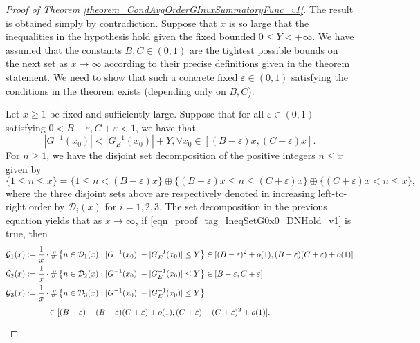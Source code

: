 \documentclass[11pt,reqno,a4letter]{article}
\numberwithin{figure}{section}
\numberwithin{table}{section}
\theoremstyle{plain}
\numberwithin{theorem}{section}
\theoremstyle{definition}
\begin{document}
\begin{proof}[Proof of Theorem \ref{theorem_CondAvgOrderGInvxSummatoryFunc_v1}] 
\label{proofOf_theorem_CondAvgOrderGInvxSummatoryFunc_v1} 
The result is obtained simply by contradiction. Suppose that $x$ is so large that the inequalities in the 
hypothesis hold given the fixed bounded $0 \leq Y < +\infty$. 
We have assumed that the constants $B,C \in (0, 1)$ are the tightest possible bounds on the next set as 
$x \rightarrow \infty$ according to their precise definitions given in the theorem statement. 
We need to show that such a 
concrete fixed $\varepsilon \in (0, 1)$ 
satisfying the conditions in the theorem exists (depending only on $B,C$). 

Let $x \geq 1$ be fixed and sufficiently large. 
Suppose that for all $\varepsilon \in (0, 1)$ satisfying $0 < B - \varepsilon, C+\varepsilon < 1$, we have that 
\begin{equation} 
\label{eqn_proof_tag_IneqSetG0x0_DNHold_v1} 
|G^{-1}(x_0)| < |G_E^{-1}(x_0)| + Y, \forall x_0 \in [(B-\varepsilon) x, (C+\varepsilon) x]. 
\end{equation} 
For $n \geq 1$, we have the disjoint set decomposition of the positive integers $n \leq x$ given by  
\[
\{1 \leq n \leq x\} = \{1 \leq n < (B-\varepsilon) x\} \oplus 
     \{(B-\varepsilon) x \leq n \leq (C + \varepsilon) x\} \oplus 
     \{(C+\varepsilon) x < n \leq x\}, 
\]
where the three disjoint sets above are respectively denoted in increasing 
left-to-right order by $\mathcal{D}_i(x)$ for $i = 1,2,3$. 
The set decomposition in the previous equation yields that as 
$x \rightarrow \infty$, if \eqref{eqn_proof_tag_IneqSetG0x0_DNHold_v1} is true, then 
\begin{align} 
\label{eqn_proof_tag_G123xDensityBounds_v1} 
\mathcal{G}_1(x) & := \frac{1}{x} \cdot \#\left\{n \in \mathcal{D}_1(x): |G^{-1}(x_0)| - |G_E^{-1}(x_0)| \leq Y\right\} 
     \in [(B-\varepsilon)^2 + o(1), (B-\varepsilon) (C+\varepsilon) + o(1)] \\ 
\notag 
\mathcal{G}_2(x) & := \frac{1}{x} \cdot \#\left\{n \in \mathcal{D}_2(x): |G^{-1}(x_0)| - |G_E^{-1}(x_0)| \leq Y\right\} 
     \in [B-\varepsilon, C+\varepsilon] \\ 
\notag 
\mathcal{G}_3(x) & := \frac{1}{x} \cdot \#\left\{n \in \mathcal{D}_3(x): |G^{-1}(x_0)| - |G_E^{-1}(x_0)| \leq Y\right\} \\ 
\notag 
     & \phantom{:= \frac{1}{x} \cdot \ } 
     \in [(B-\varepsilon)-(B-\varepsilon) (C+\varepsilon) + o(1), (C+\varepsilon)-(C+\varepsilon)^2 + o(1)]. 

\end{align}
\end{proof}
\end{document}
